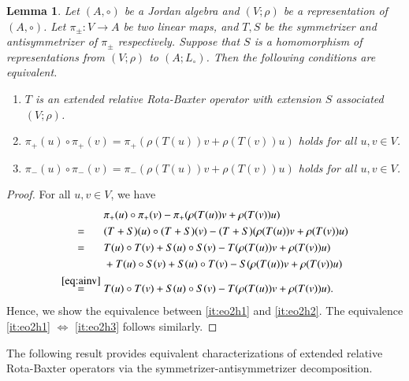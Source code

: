 \documentclass[12pt, reqno, a4paper]{amsart}
\newtheorem{lemma}[theorem]{Lemma}
\theoremstyle{definition}
\begin{document}
\begin{lemma}\label{lem:iphr}
	Let $(A, \circ)$ be a Jordan algebra and $(V; \rho)$ be a representation of $(A, \circ)$. 
	Let $\pi_{\pm}: V \to A$ be two linear maps, and $T, S$ be the symmetrizer and antisymmetrizer of $\pi_{\pm}$ respectively.
	Suppose that $S$ is a homomorphism of representations from $(V; \rho)$ to $(A; L_{\circ})$.
	Then the following conditions are equivalent.
	\begin{enumerate}[label=(\roman*)]
		\item\label{it:eo2h1}
		      $T$ is an extended relative Rota-Baxter operator with extension $S$ associated $(V; \rho)$.

		\item\label{it:eo2h2}
		      $\pi_{+}(u) \circ \pi_{+}(v)  = \pi_{+}(\rho(T(u))v + \rho(T(v))u)$ holds for all $u, v \in V$.

		\item\label{it:eo2h3}
		      $\pi_{-}(u) \circ \pi_{-}(v) = \pi_{-}(\rho(T(u))v + \rho(T(v))u)$ holds for all $u, v \in V$.

	\end{enumerate}
\end{lemma}
\begin{proof}
	For all $u, v \in V$, we have
	\begin{align*}
		& \pi_{+}(u) \circ \pi_{+}(v) - \pi_{+}(\rho(T(u))v + \rho(T(v))u)                                          \\
		\overset{\hphantom{\eqref{eq:ainv}}}{=}\; &  (T+S)(u) \circ (T+S)(v) - (T+S)(\rho(T(u))v + \rho(T(v))u )       \\
		\overset{\hphantom{\eqref{eq:ainv}}}{=}\; &  T(u) \circ T(v) + S(u) \circ S(v) - T(\rho(T(u))v + \rho(T(v))u)  \\
		& + T(u) \circ S(v) + S(u) \circ T(v) - S(\rho(T(u))v + \rho(T(v))u)                                  \\
		\overset{\eqref{eq:ainv}}{=}\; & T(u) \circ T(v) + S(u) \circ S(v) - T(\rho(T(u))v + \rho(T(v))u).
	\end{align*}
	Hence, we show the equivalence between \ref{it:eo2h1} and \ref{it:eo2h2}.
	The equivalence \ref{it:eo2h1} $\Longleftrightarrow$ \ref{it:eo2h3} follows similarly.
\end{proof}


The following result provides equivalent characterizations of extended relative Rota-Baxter operators via the symmetrizer-antisymmetrizer decomposition.
\end{document}
